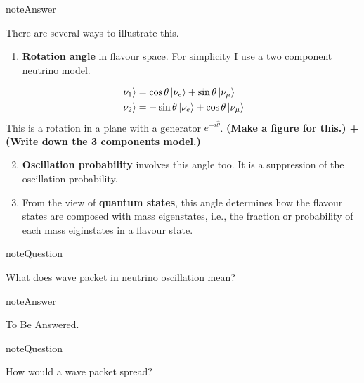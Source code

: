 \documentclass[letterpaper,12pt,english]{sphinxmanual}
\newcommand{\ket}[1]{\left| #1\right\rangle}
\begin{document}
\begin{notice}{note}{Answer}

There are several ways to illustrate this.
\begin{enumerate}
\item {} 
\textbf{Rotation angle} in flavour space. For simplicity I use a two component neutrino model.

\end{enumerate}
\begin{gather}
\begin{split}\ket{\nu_1} &= \cos\theta \ket{\nu_e} + \sin \theta \ket{\nu_\mu} \\
\ket{\nu_2} & = -\sin\theta \ket{\nu_e} + \cos\theta \ket{\nu_\mu}\end{split}\notag
\end{gather}
This is a rotation in a plane with a generator \(e^{-i\hat \theta}\). \textbf{(Make a figure for this.) + (Write down the 3 components model.)}
\begin{enumerate}
\setcounter{enumi}{1}
\item {} 
\textbf{Oscillation probability} involves this angle too. It is a suppression of the oscillation probability.

\item {} 
From the view of \textbf{quantum states}, this angle determines how the flavour states are composed with mass eigenstates, i.e., the fraction or probability of each mass eiginstates in a flavour state.

\end{enumerate}
\end{notice}

\begin{notice}{note}{Question}

What does wave packet in neutrino oscillation mean?
\end{notice}

\begin{notice}{note}{Answer}

To Be Answered.
\end{notice}

\begin{notice}{note}{Question}

How would a wave packet spread?
\end{notice}
\end{document}
